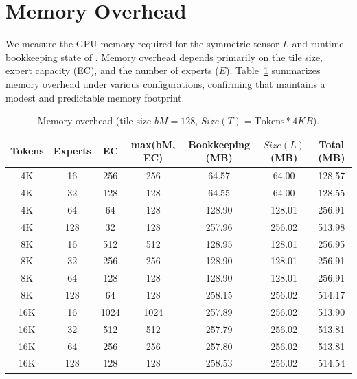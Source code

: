 \section{Memory Overhead}\label{sec:eval:memory}
We measure the GPU memory required for the symmetric tensor $L$ and runtime bookkeeping state of \sysname.
Memory overhead depends primarily on the tile size, expert capacity (EC), and the number of experts ($E$).
Table~\ref{tab:memory-overhead} summarizes memory overhead under various configurations,
confirming that \sysname maintains a modest and predictable memory footprint.
\begin{table}[!ht]
    \centering
    \caption{Memory overhead (tile size $bM = 128$, $Size(T) = \text{Tokens} * 4KB$).}
    \label{tab:memory-overhead}
    \setlength{\tabcolsep}{2pt}
    \renewcommand{\arraystretch}{0.9}
    \begin{tabular}{ccccccc}
        \toprule
        \textbf{Tokens} & \textbf{Experts} & \textbf{EC} & \textbf{max(bM, EC)} & \textbf{Bookkeeping (MB)} & $Size(L)$ \textbf{(MB)} & \textbf{Total (MB)} \\
        \midrule
        4K  & 16  & 256  & 256  & 64.57  & 64.00  & 128.57 \\
        4K  & 32  & 128  & 128  & 64.55  & 64.00  & 128.55 \\
        4K  & 64  & 64   & 128  & 128.90 & 128.01 & 256.91 \\
        4K  & 128 & 32   & 128  & 257.96 & 256.02 & 513.98 \\
        \midrule
        8K  & 16  & 512  & 512  & 128.95 & 128.01 & 256.95 \\
        8K  & 32  & 256  & 256  & 128.90 & 128.01 & 256.91 \\
        8K  & 64  & 128  & 128  & 128.90 & 128.01 & 256.91 \\
        8K  & 128 & 64   & 128  & 258.15 & 256.02 & 514.17 \\
        \midrule
        16K & 16  & 1024 & 1024 & 257.89 & 256.02 & 513.90 \\
        16K & 32  & 512  & 512  & 257.79 & 256.02 & 513.81 \\
        16K & 64  & 256  & 256  & 257.80 & 256.02 & 513.81 \\
        16K & 128 & 128  & 128  & 258.53 & 256.02 & 514.54 \\
        \bottomrule
    \end{tabular}
\end{table}
\clearpage
